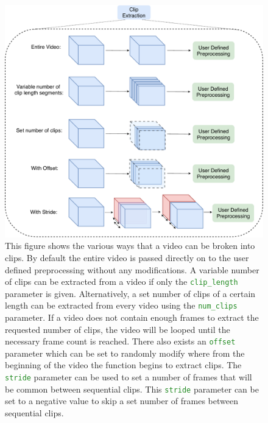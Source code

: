 \documentclass{llncs}
\begin{document}
\begin{figure}[t!]
\centering
\includegraphics[width=0.8\columnwidth]{images/extract_clips.pdf}
\caption{This figure shows the various ways that a video can be broken into clips.
By default the entire video is passed directly on to the user defined preprocessing without any modifications.
A variable number of clips can be extracted from a video if only the \texttt{\textcolor{ForestGreen}{clip\_length}} parameter is given.
Alternatively, a set number of clips of a certain length can be extracted from every video using the \texttt{\textcolor{ForestGreen}{num\_clips}} parameter.
If a video does not contain enough frames to extract the requested number of clips, the video will be looped until the necessary frame count is reached.
There also exists an \texttt{\textcolor{ForestGreen}{offset}} parameter which can be set to randomly modify where from the beginning of the video the function begins to extract clips. 
The \texttt{\textcolor{ForestGreen}{stride}}  parameter can be used to set a number of frames that will be common between sequential clips.
This \texttt{\textcolor{ForestGreen}{stride}} parameter can be set to a negative value to skip a set number of frames between sequential clips.
}
\label{fig:extract_clips}
\end{figure}
\end{document}
